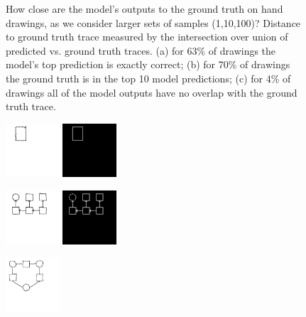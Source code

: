 \documentclass{article}
\begin{document}
\begin{figure}
\begin{minipage}{0.6\textwidth}
  \caption{How close are the model's outputs to the ground truth on hand drawings, as we consider larger sets of samples (1,10,100)?
    Distance to ground truth trace measured by the intersection over union of predicted vs. ground truth traces. (a) for 63\% of drawings the model's top prediction is exactly correct; (b) for 70\% of drawings the ground truth is in the top 10 model predictions; (c) for 4\% of drawings all of the model outputs have no overlap with the ground truth trace.}\label{drawingIntersectionOverUnion}
    \end{minipage}
\end{figure}


\begin{figure}[H]
  \begin{minipage}[t]{2.25cm}
    \includegraphics[width = 2cm]{figures/expert-10.png}
    \includegraphics[width = 2cm]{figures/10-parse.png}    
  \end{minipage}
  \begin{minipage}[t]{2.25cm}
    \includegraphics[width = 2cm]{figures/expert-21.png}
    \includegraphics[width = 2cm]{figures/21-parse.png}    
  \end{minipage}
  \begin{minipage}[t]{2.25cm}
    \includegraphics[width = 2cm]{figures/expert-77.png}

\end{minipage}
\end{figure}
\end{document}
